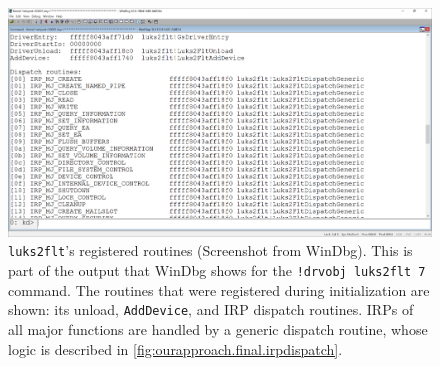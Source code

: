 \begin{figure}[htb!]
	\center
	\includegraphics[scale=0.35]{../img/ourapproach.final.windbgdispatch.png}
	\caption[
		\texttt{luks2flt}'s registered routines
	]{
		\texttt{luks2flt}'s registered routines (Screenshot from WinDbg). This is part of the output that WinDbg shows for the \texttt{!drvobj luks2flt 7} command. The routines that were registered during initialization are shown: its unload, \texttt{AddDevice}, and IRP dispatch routines. IRPs of all major functions are handled by a generic dispatch routine, whose logic is described in \autoref{fig:ourapproach.final.irpdispatch}.
	}
	\label{fig:ourapproach.final.windbgdispatch}
\end{figure}

